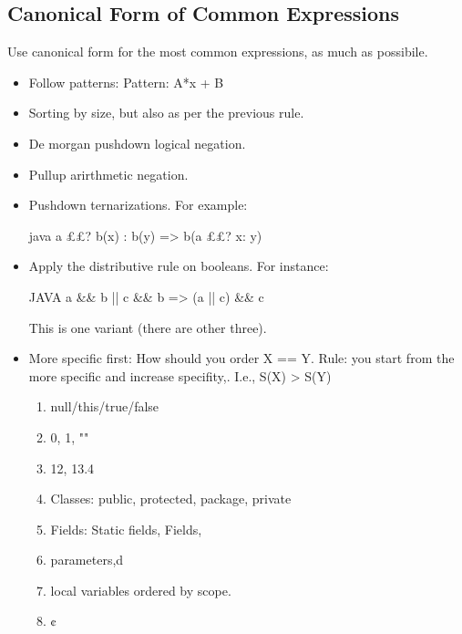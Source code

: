 \subsection{Canonical Form of Common Expressions}
Use canonical form for the most common expressions, as much as possibile.
\begin{itemize}
  \item Follow patterns: Pattern: A*x + B
  \item Sorting by size, but also as per the previous rule.
  \item De morgan pushdown logical negation.
  \item Pullup arirthmetic negation.
  \item Pushdown ternarizations. For example:
  \begin{code}{java}
a ££? b(x) : b(y) => b(a ££? x: y)
  \end{code}
  \item Apply the distributive rule on booleans. For instance:
    \begin{code}{JAVA}
a && b || c && b => (a || c) && c
    \end{code}
      This is one variant (there are other three).
  \item More specific first: How should you order X == Y.
        Rule: you start from the more specific and increase specifity,.
        I.e., S(X) > S(Y)
        \begin{enumerate}
          \item null/this/true/false
          \item 0, 1, ""
          \item 12, 13.4
          \item Classes: public, protected, package, private
          \item Fields: Static fields, Fields,
          \item parameters,d
          \item local variables ordered by scope.
          \item ¢
        \end{enumerate}
\end{itemize}

